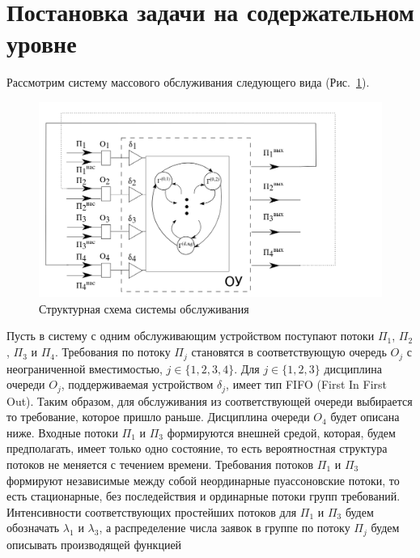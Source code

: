 \documentclass[a4paper,12pt,russian]{extarticle}
\begin{document}

\section{Постановка задачи на содержательном уровне}

Рассмотрим систему массового обслуживания следующего вида (Рис.~\ref{SystemScheme}).
\begin{figure}[h]
\includegraphics[scale=0.45]{SystemScheme.png} 
\caption{Структурная схема системы обслуживания}
\label{SystemScheme}
\end{figure}
Пусть в систему с одним обслуживающим устройством поступают потоки $\Pi_1$, $\Pi_2$, $\Pi_3$  и $\Pi_4$. Требования по потоку $\Pi_j$ становятся в соответствующую очередь $O_j$ с неограниченной вместимостью, $j\in \{1, 2, 3, 4\}$. Для $j \in \{1, 2, 3\}$ дисциплина очереди $O_j$, поддерживаемая устройством $\delta_j$, имеет тип FIFO (First In First Out). Таким образом, для обслуживания из соответствующей очереди выбирается то требование, которое пришло раньше. Дисциплина очереди $O_4$ будет описана ниже. Входные потоки $\Pi_1$ и $\Pi_3$ формируются внешней средой, которая, будем предполагать, имеет только одно состояние, то есть вероятностная структура потоков не меняется с течением времени. Требования потоков $\Pi_1$ и $\Pi_3$ формируют независимые между собой неординарные пуассоновские потоки, то есть  стационарные, без последействия и ординарные потоки групп требований. Интенсивности соответствующих простейших потоков для $\Pi_1$ и $\Pi_3$ будем обозначать $\lambda_1$ и $\lambda_3$, а распределение числа заявок в группе по потоку $\Pi_j$ будем описывать производящей функцией
\end{document}
